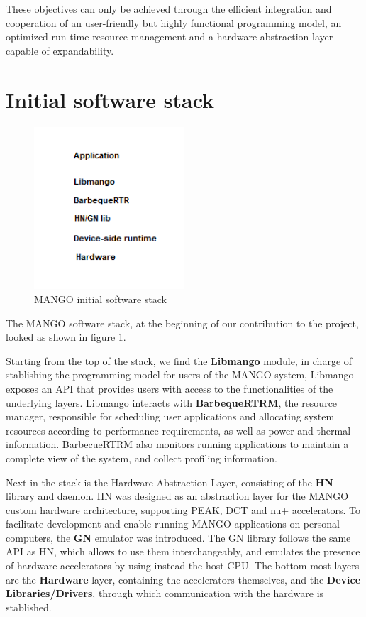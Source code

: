 These objectives can only be achieved through the efficient integration and cooperation of an user-friendly but highly functional programming model, an optimized run-time resource management and a hardware abstraction layer capable of expandability.

\section{Initial software stack}

\begin{figure}[ht]
    \centering
    \includegraphics[width=0.5\textwidth]{img/mango-initial-stack.png}
    \captionsetup{justification=centering}
    \caption{MANGO initial software stack}
    \label{fig:mango_initial_stack}
\end{figure}
 
The MANGO software stack, at the beginning of our contribution to the project, looked as shown in figure \ref{fig:mango_initial_stack}.

Starting from the top of the stack, we find the \textbf{Libmango} module, in charge of stablishing the programming model for users of the MANGO system, Libmango exposes an API that provides users with access to the functionalities of the underlying layers. 
Libmango interacts with \textbf{BarbequeRTRM}, the resource manager, responsible for scheduling user applications and allocating system resources according to performance requirements, as well as power and thermal information. BarbecueRTRM also monitors running applications to maintain a complete view of the system, and collect profiling information.

Next in the stack is the Hardware Abstraction Layer, consisting of the \textbf{HN} library and daemon. HN was designed as an abstraction layer for the MANGO custom hardware architecture, supporting PEAK, DCT and nu+ accelerators. To facilitate development and enable running MANGO applications on personal computers, the \textbf{GN} emulator was introduced. The GN library follows the same API as HN, which allows to use them interchangeably, and emulates the presence of hardware accelerators by using instead the host CPU.
The bottom-most layers are the \textbf{Hardware} layer, containing the accelerators themselves, and the \textbf{Device Libraries/Drivers}, through which communication with the hardware is stablished.

